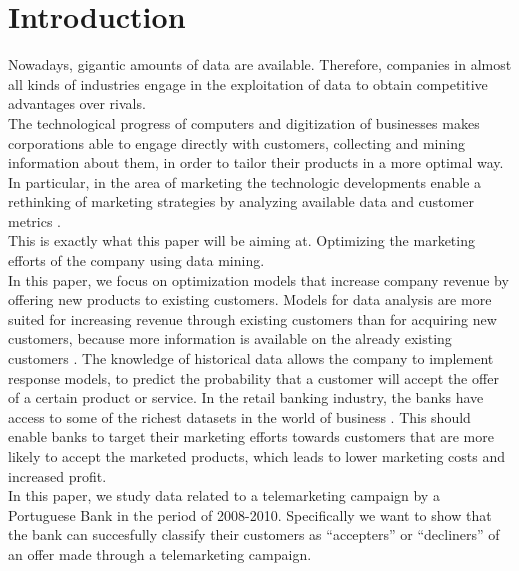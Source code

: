 \pagestyle{empty} %

\titleGP %

    \newpage
    \pagestyle{fancy}
    \section{Introduction}

    \noindent Nowadays, gigantic amounts of data are available. Therefore, companies in almost all kinds of industries engage in the exploitation of data to obtain competitive advantages over rivals\citep{provost2013data}.\\
    The technological progress of computers and digitization of businesses makes corporations able to engage directly with customers, collecting and mining information about them, in order to tailor their products in a more optimal way\citep{rust2010rethinking}.\\ 
    [\baselineskip]\indent
    In particular, in the area of marketing the technologic developments enable a rethinking of marketing strategies by analyzing available data and customer metrics \citep{moro2014data}. \\
    This is exactly what this paper will be aiming at. Optimizing the marketing efforts of the company using data mining.\\
    In this paper, we focus on optimization models that increase company revenue by offering new products to existing customers. Models for data analysis are more suited for increasing revenue through existing customers than for acquiring new customers, because more information is available on the already existing customers \citep{nobibon2011optimization}. The knowledge of historical data allows the company to implement response models, to predict the probability that a customer will accept the offer of a certain product or service. In the retail banking industry, the banks have access to some of the richest datasets in the world of business \citep{nobibon2011optimization}. This should enable banks to target their marketing efforts towards customers that are more likely to accept the marketed products, which leads to lower marketing costs and increased profit.\\
    In this paper, we study data related to a telemarketing campaign by a Portuguese Bank in the period of 2008-2010. Specifically we want to show that the bank can succesfully classify their customers as “accepters” or “decliners” of an offer made through a telemarketing campaign.\\
